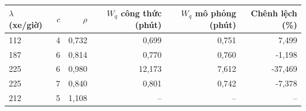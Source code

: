 \begin{tabular}{lrrrrr}
\toprule
\textbf{$\lambda$ (xe/giờ)} & \textbf{$c$} & \textbf{$\rho$} & \textbf{$W_q$ công thức (phút)} & \textbf{$W_q$ mô phỏng (phút)} & \textbf{Chênh lệch (\%)} \\
\midrule
112 & 4 & 0{,}732 & 0{,}699 & 0{,}751 & 7{,}499 \\
187 & 6 & 0{,}814 & 0{,}770 & 0{,}760 & -1{,}198 \\
225 & 6 & 0{,}980 & 12{,}173 & 7{,}612 & -37{,}469 \\
225 & 7 & 0{,}840 & 0{,}801 & 0{,}742 & -7{,}378 \\
212 & 5 & 1{,}108 & -- & -- & -- \\
\bottomrule
\end{tabular}

